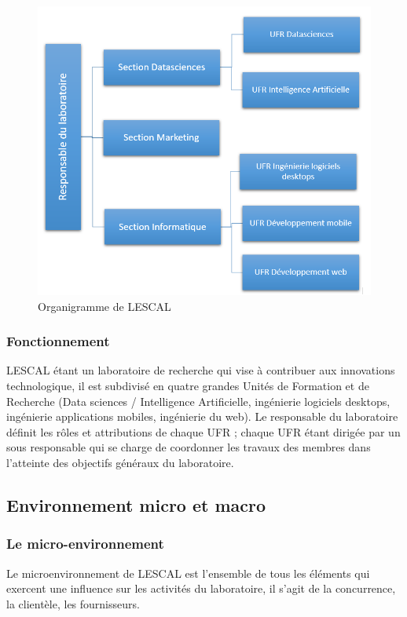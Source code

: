 \begin{figure}[h]
    \includegraphics[width=1 \textwidth ]{img/orga.png}
    \caption{Organigramme de LESCAL}
\end{figure}


\subsubsection{Fonctionnement}
LESCAL étant un laboratoire de recherche qui vise à contribuer aux innovations 
technologique, il est subdivisé en quatre grandes Unités de Formation et de 
Recherche (Data sciences / Intelligence Artificielle, ingénierie logiciels 
desktops, ingénierie applications mobiles, ingénierie du web). Le responsable
du laboratoire définit les rôles et attributions de chaque UFR ; chaque UFR
étant dirigée par un sous responsable qui se charge de coordonner les travaux
des membres dans l'atteinte des objectifs généraux du laboratoire.


\subsection{Environnement micro et macro}

\subsubsection{Le micro-environnement}
Le microenvironnement de LESCAL est l'ensemble de tous les éléments qui 
exercent une influence sur les activités du laboratoire, il s'agit de la 
concurrence, la clientèle, les fournisseurs.


